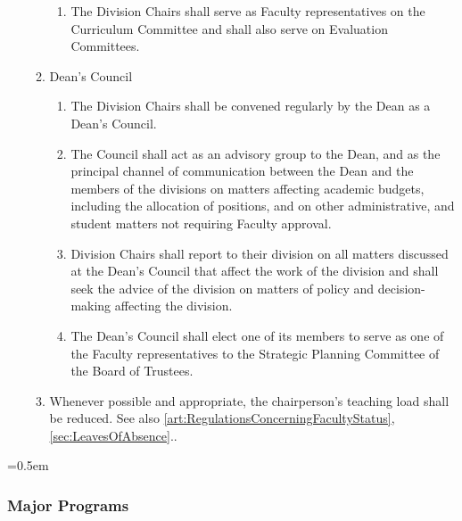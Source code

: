 \documentclass{manual}
\let\oldsubsubsection\subsubsection
\renewcommand\subsubsection{\leftskip=0.5em\oldsubsubsection}
\newcommand{\itemLevelA}{\alph*.}
\newcommand{\itemLevelB}{\arabic*)}
\newcommand{\itemLevelC}{\alph*)}
\newcommand{\itemRefA}{\alph*}
\newcommand{\itemRefB}{\arabic*}
\newcommand{\itemRefC}{\alph*}
\begin{document}
\begin{enumerate}[label=\itemLevelA,ref=\itemRefA]
\begin{enumerate}[label=\itemLevelB,ref=\itemRefB]
\begin{enumerate}[label=\itemLevelC,ref=\itemRefC]
\item The Division Chairs shall serve as Faculty representatives on the Curriculum Committee and shall also serve on Evaluation Committees. 
\end{enumerate}


\item \label{iitem:deansCouncil02} Dean's Council
\begin{enumerate}[label=\itemLevelC,ref=\itemRefC]

\item The Division Chairs shall be convened regularly by the Dean as a Dean's Council.


\item The Council shall act as an advisory group to the Dean, and as the principal channel of communication between the Dean and the members of the divisions on matters affecting academic budgets, including the allocation of positions, and on other administrative, and student matters not requiring Faculty approval.

\item Division Chairs shall report to their division on all matters discussed at the Dean's Council that affect the work of the division and shall seek the advice of the division on matters of policy and decision-making affecting the division.

\item The Dean's Council shall elect one of its members to serve as one of the Faculty representatives to the Strategic Planning Committee of the Board of Trustees.
\end{enumerate}

\item \label{iitem:courseRelief03} Whenever possible and appropriate, the chairperson's teaching load shall be reduced. See also \cref{art:RegulationsConcerningFacultyStatus}, \cref{sec:LeavesOfAbsence}..

\end{enumerate}

\end{enumerate}


\subsubsection{Major Programs}
\end{document}
